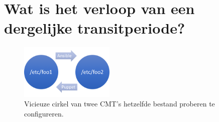  
\section{Wat is het verloop van een dergelijke transitperiode?}
\label{sec:methodologie-verloop-transit}



\begin{figure}
\centering
\includegraphics[width=0.4\textwidth]{img/vicieuzecirkel.PNG}
\caption{\label{fig:vicieuzecirkel}Vicieuze cirkel van twee \gls{CMT}'s hetzelfde bestand proberen te configureren.}
\end{figure}

